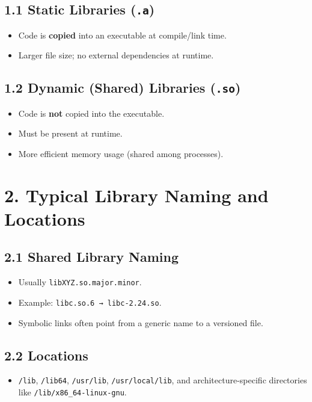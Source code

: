 \documentclass[12pt,a4paper]{report}
\begin{document}
\subsection*{1.1 Static Libraries (\texttt{.a})}
\begin{itemize}
    \item Code is \textbf{copied} into an executable at compile/link time.  
    \item Larger file size; no external dependencies at runtime.
\end{itemize}

\subsection*{1.2 Dynamic (Shared) Libraries (\texttt{.so})}
\begin{itemize}
    \item Code is \textbf{not} copied into the executable.  
    \item Must be present at runtime.  
    \item More efficient memory usage (shared among processes).
\end{itemize}

 

\section*{2. Typical Library Naming and Locations}

\subsection*{2.1 Shared Library Naming}
\begin{itemize}
    \item Usually \texttt{libXYZ.so.major.minor}.  
    \item Example: \texttt{libc.so.6 → libc-2.24.so}.  
    \item Symbolic links often point from a generic name to a versioned file.
\end{itemize}

\subsection*{2.2 Locations}
\begin{itemize}
    \item \texttt{/lib}, \texttt{/lib64}, \texttt{/usr/lib}, \texttt{/usr/local/lib}, and architecture-specific directories like \texttt{/lib/x86\_64-linux-gnu}.
\end{itemize}
\end{document}
